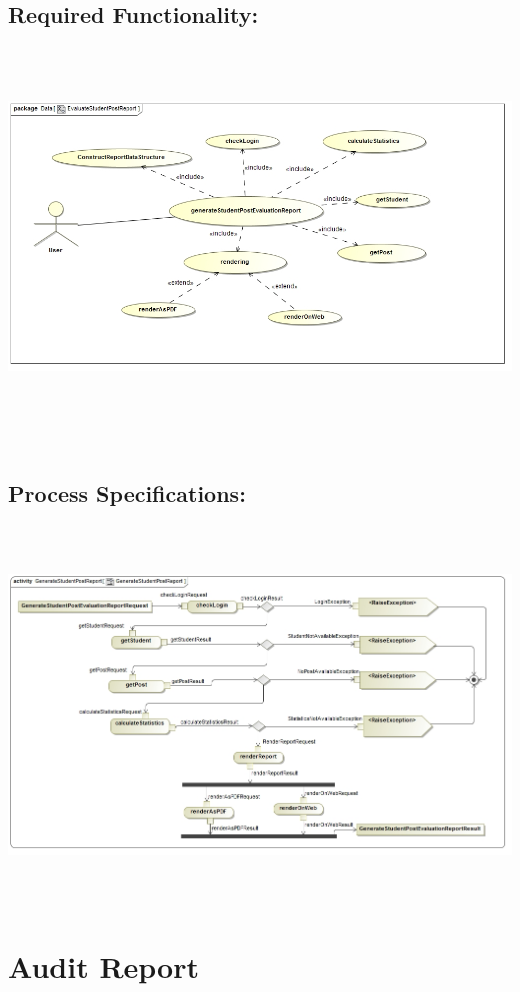 \documentclass[a4paper,11pt]{article}
\begin{document}
\subsection{Required Functionality:} 
\includegraphics[width=15cm,height=10cm]{./Images/Report/studentPost_FR}\\
\\
\subsection{Process Specifications:} 
\includegraphics[width=15cm,height=10cm]{./Images/Report/StudentPost_PS}

\section{Audit Report}
\end{document}
